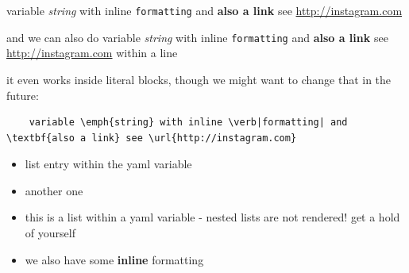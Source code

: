 
variable \emph{string} with inline \verb|formatting| and \textbf{also a link} see \url{http://instagram.com}

and we can also do variable \emph{string} with inline \verb|formatting| and \textbf{also a link} see \url{http://instagram.com} within a line

it even works inside literal blocks, though we might want to change that in the future:
\begin{verbatim}
    variable \emph{string} with inline \verb|formatting| and \textbf{also a link} see \url{http://instagram.com}
\end{verbatim}

\begin{itemize}
    \item list entry within the yaml variable
    \item another one
\end{itemize}

\begin{itemize}
    \item this is a list within a yaml variable - nested lists are not rendered! get a hold of yourself
    \item we also have some \textbf{inline} formatting
\end{itemize}
